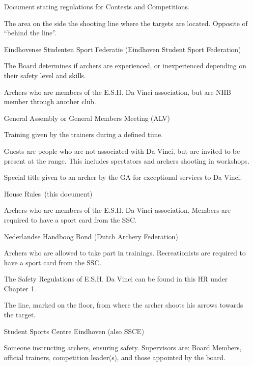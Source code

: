 \documentclass[a4paper]{article}
\newcommand{\Ahr}{House Rules} %
\newcommand{\Asr}{Safety Rules} %
\newcommand{\Awr}{Contest Rules} %
\begin{document}
\begin{description}[font=\sffamily\bfseries, leftmargin=1cm, style=nextline]
\item[{\defi \Awr}] Document stating regulations for Contests and Competitions.
\item[{\defi Downrange of the Line}] The area on the side the { shooting line} where the targets are located. Opposite of { ``behind the line''}.
    \item[{\defi ESSF}]
    Eindhovense Studenten Sport Federatie (Eindhoven Student Sport Federation)
\item[{\defi Experienced - Inexperienced}] The Board determines if { archers} are experienced, or inexperienced depending on their safety level and skills.
\item[{\defi External Member}]
{ Archers} who are members of the E.S.H. Da Vinci association, but are { NHB} member through another club.
  \item[{\defi GA}]
    General Assembly or General Members Meeting (ALV)
\item[{\defi General Training}] Training given by the trainers during a defined time.
\item[{\defi Guest}] Guests are people who are not associated with Da Vinci, but are invited to be present at the range. This includes spectators and archers shooting in workshops.
\item[{\defi Honorary Member}] Special title given to an { archer} by the { GA} for exceptional services to Da Vinci.
    \item[{\defi HR}] \Ahr\ (this document)
\item[{\defi Member}]
{ Archers} who are members of the E.S.H. Da Vinci association. Members are required to have a sport card from the { SSC}.
    \item[{\defi NHB}]
    Nederlandse Handboog Bond (Dutch Archery Federation)
\item[{\defi Recreationist}]
{ Archers} who are allowed to take part in trainings. Recreationists are required to have a sport card from the { SSC}.
    \item[{\defi \Asr}]
    The Safety Regulations of E.S.H. Da Vinci can be found in this { HR} under Chapter 1.
    \item[{\defi Shooting Line}]
    The line, marked on the floor, from where the { archer} shoots his arrows towards the target.
    \item[{\defi SSC}]
    Student Sports Centre Eindhoven (also SSCE)
\item[{\defi Supervisor}] Someone instructing { archers}, ensuring safety. Supervisors are: Board Members, official trainers, competition leader(s), and those appointed by the board.

\end{description}
\end{document}
